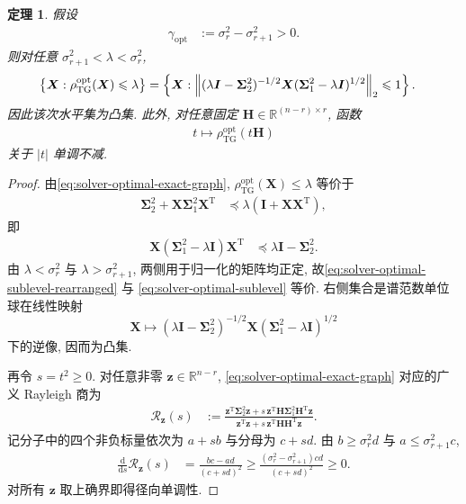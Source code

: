 \documentclass{ctexart}
\newcommand{\T}{\mathrm{T}}
\newcommand{\R}{\mathbb{R}}
\renewcommand{\ge}{\geqslant}
\renewcommand{\le}{\leqslant}
\DeclarePairedDelimiter\norm{\lVert}{\rVert}
\newtheorem{theorem}{定理}[section]
\begin{document}
\begin{theorem}
\label{thm:solver-optimal-quasiconvex}
假设
\begin{align}
    \gamma_{\mathrm{opt}}
    &:=
    \sigma_r^2-\sigma_{r+1}^2>0.
    \label{eq:solver-optimal-gap}
\end{align}
则对任意
$\sigma_{r+1}^2<\lambda<\sigma_r^2$,
\begin{align}
    \left\{
      \bm X:\rho_{\mathrm{TG}}^{\mathrm{opt}}(\bm X)\le\lambda
    \right\}
    &=
    \left\{
      \bm X:
      \norm*{
        (\lambda\bm I-\bm\Sigma_2^2)^{-1/2}
        \bm X
        (\bm\Sigma_1^2-\lambda\bm I)^{1/2}
      }_2
      \le1
    \right\}.
    \label{eq:solver-optimal-sublevel}
\end{align}
因此该次水平集为凸集. 此外, 对任意固定
$\bm H\in\R^{(n-r)\times r}$,
函数
\begin{align}
    t\longmapsto
    \rho_{\mathrm{TG}}^{\mathrm{opt}}(t\bm H)
    \label{eq:solver-optimal-radial-profile}
\end{align}
关于 $|t|$ 单调不减.
\end{theorem}

\begin{proof}
由\cref{eq:solver-optimal-exact-graph},
$\rho_{\mathrm{TG}}^{\mathrm{opt}}(\bm X)\le\lambda$
等价于
\begin{align}
    \bm\Sigma_2^2+\bm X\bm\Sigma_1^2\bm X^\T
    &\preceq
    \lambda(\bm I+\bm X\bm X^\T),
    \label{eq:solver-optimal-sublevel-loewner}
\end{align}
即
\begin{align}
    \bm X(\bm\Sigma_1^2-\lambda\bm I)\bm X^\T
    &\preceq
    \lambda\bm I-\bm\Sigma_2^2.
    \label{eq:solver-optimal-sublevel-rearranged}
\end{align}
由 $\lambda<\sigma_r^2$ 与
$\lambda>\sigma_{r+1}^2$, 两侧用于归一化的矩阵均正定,
故\cref{eq:solver-optimal-sublevel-rearranged} 与
\cref{eq:solver-optimal-sublevel} 等价. 右侧集合是谱范数单位球在线性映射
\[
\bm X\longmapsto
(\lambda\bm I-\bm\Sigma_2^2)^{-1/2}
\bm X(\bm\Sigma_1^2-\lambda\bm I)^{1/2}
\]
下的逆像, 因而为凸集.

再令 $s=t^2\ge0$. 对任意非零
$\bm z\in\R^{n-r}$, \cref{eq:solver-optimal-exact-graph}
对应的广义 Rayleigh 商为
\begin{align}
    \mathcal R_{\bm z}(s)
    &:=
    \frac{
      \bm z^\T\bm\Sigma_2^2\bm z
      +s\,\bm z^\T\bm H\bm\Sigma_1^2\bm H^\T\bm z
    }{
      \bm z^\T\bm z
      +s\,\bm z^\T\bm H\bm H^\T\bm z
    }.
    \label{eq:solver-optimal-radial-rayleigh}
\end{align}
记分子中的四个非负标量依次为 $a+s b$ 与分母为 $c+s d$.
由
$b\ge\sigma_r^2d$ 与
$a\le\sigma_{r+1}^2c$,
\begin{align}
    \frac{\mathrm d}{\mathrm ds}\mathcal R_{\bm z}(s)
    &=
    \frac{bc-ad}{(c+sd)^2}
    \ge
    \frac{
      (\sigma_r^2-\sigma_{r+1}^2)cd
    }{(c+sd)^2}
    \ge0.
    \label{eq:solver-optimal-radial-derivative}
\end{align}
对所有 $\bm z$ 取上确界即得径向单调性.
\end{proof}
\end{document}

